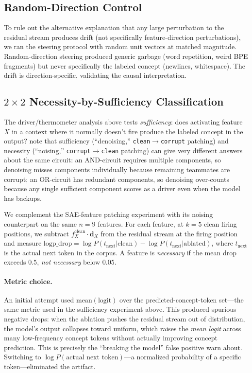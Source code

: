 \documentclass[11pt]{article}
\begin{document}
\subsection{Random-Direction Control}

To rule out the alternative explanation that any large perturbation to the
residual stream produces drift (not specifically feature-direction perturbations),
we ran the steering protocol with random unit vectors at matched magnitude.
Random-direction steering produced generic garbage (word repetition, weird BPE
fragments) but never specifically the labeled concept (newlines, whitespace).
The drift is direction-specific, validating the causal interpretation.

\subsection{$2 \times 2$ Necessity-by-Sufficiency Classification}
\label{sec:twobytwo}

The driver/thermometer analysis above tests \emph{sufficiency}: does activating
feature $X$ in a context where it normally doesn't fire produce the labeled
concept in the output? \citep{heimersheim2024howto} note that sufficiency
(``denoising,'' \texttt{clean$\to$corrupt} patching) and necessity (``noising,''
\texttt{corrupt$\to$clean} patching) can give very different answers about the
same circuit: an AND-circuit requires multiple components, so denoising misses
components individually because remaining teammates are corrupt; an OR-circuit
has redundant components, so denoising over-counts because any single sufficient
component scores as a driver even when the model has backups.

We complement the SAE-feature patching experiment with its noising counterpart
on the same $n{=}9$ features. For each feature, at $k{=}5$ clean firing
positions, we subtract $f^{\text{clean}}_X \cdot \mathbf{d}_X$ from the residual
stream at the firing position and measure
$\text{logp\_drop} = \log P(t_{\text{next}}|\text{clean}) -
\log P(t_{\text{next}}|\text{ablated})$, where $t_{\text{next}}$ is the actual
next token in the corpus. A feature is \emph{necessary} if the mean drop exceeds
$0.5$, \emph{not necessary} below $0.05$.

\paragraph{Metric choice.} An initial attempt used $\text{mean}(\text{logit})$ over
the predicted-concept-token set---the same metric used in the sufficiency experiment
above. This produced spurious negative drops: when the ablation pushes the
residual stream out of distribution, the model's output collapses toward
uniform, which raises the \emph{mean logit} across many low-frequency concept
tokens without actually improving concept prediction. This is precisely the
``breaking the model'' false positive \citep{heimersheim2024howto} warn about.
Switching to $\log P(\text{actual next token})$---a normalized probability of a
specific token---eliminated the artifact.
\end{document}
